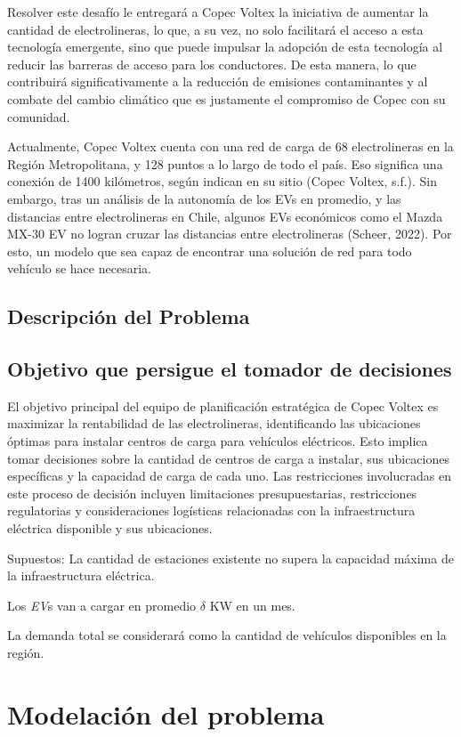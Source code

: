 \documentclass[letterpaper]{article}
\begin{document}
\begin{flushleft}
	Resolver este desafío le entregará a Copec Voltex la iniciativa de aumentar la cantidad de electrolineras, lo que, a su vez, no solo facilitará el acceso a esta tecnología emergente, sino que puede impulsar la adopción de esta tecnología al reducir las barreras de acceso para los conductores. De esta manera, lo que contribuirá significativamente a la reducción de emisiones contaminantes y al combate del cambio climático que es justamente el compromiso de Copec con su comunidad.

	Actualmente, Copec Voltex cuenta con una red de carga de 68 electrolineras en la Región Metropolitana, y 128 puntos a lo largo de todo el país. Eso significa una conexión de 1400 kilómetros, según indican en su sitio (Copec Voltex, s.f.). Sin embargo, tras un análisis de la autonomía de los EVs en promedio, y las distancias entre electrolineras en Chile, algunos EVs económicos como el Mazda MX-30 EV no logran cruzar las distancias entre electrolineras (Scheer, 2022). Por esto, un modelo que sea capaz de encontrar una solución de red para todo vehículo se hace necesaria.

	\subsection{Descripción del Problema}
	\subsection{Objetivo que persigue el tomador de decisiones}
	El objetivo principal del equipo de planificación estratégica de Copec Voltex es maximizar la rentabilidad de las electrolineras, identificando las ubicaciones óptimas para instalar centros de carga para vehículos eléctricos. Esto implica tomar decisiones sobre la cantidad de centros de carga a instalar, sus ubicaciones específicas y la capacidad de carga de cada uno. Las restricciones involucradas en este proceso de decisión incluyen limitaciones presupuestarias, restricciones regulatorias y consideraciones logísticas relacionadas con la infraestructura eléctrica disponible y sus ubicaciones.

	Supuestos:
	La cantidad de estaciones existente no supera la capacidad máxima de la infraestructura eléctrica.

	Los \textit{EV}s van a cargar en promedio $\delta$ KW en un mes.

	La demanda total se considerar\'a como la cantidad de veh\'iculos disponibles en la regi\'on.
	\section{Modelación del problema}

\end{flushleft}
\end{document}
